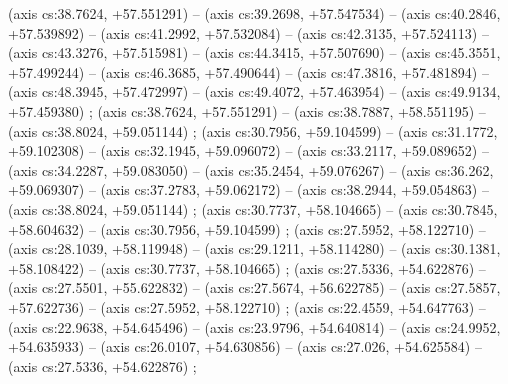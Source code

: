     (axis cs:38.7624,    +57.551291) --  (axis cs:39.2698,    +57.547534) --  (axis cs:40.2846,    +57.539892) --  (axis cs:41.2992,    +57.532084) --  (axis cs:42.3135,    +57.524113) --  (axis cs:43.3276,    +57.515981) --  (axis cs:44.3415,    +57.507690) --  (axis cs:45.3551,    +57.499244) --  (axis cs:46.3685,    +57.490644) --  (axis cs:47.3816,    +57.481894) --  (axis cs:48.3945,    +57.472997) --  (axis cs:49.4072,    +57.463954) --  (axis cs:49.9134,    +57.459380) ;
    (axis cs:38.7624,    +57.551291) --  (axis cs:38.7887,    +58.551195) --  (axis cs:38.8024,    +59.051144) ;
    (axis cs:30.7956,    +59.104599) --  (axis cs:31.1772,    +59.102308) --  (axis cs:32.1945,    +59.096072) --  (axis cs:33.2117,    +59.089652) --  (axis cs:34.2287,    +59.083050) --  (axis cs:35.2454,    +59.076267) --  (axis cs:36.262,    +59.069307) --  (axis cs:37.2783,    +59.062172) --  (axis cs:38.2944,    +59.054863) --  (axis cs:38.8024,    +59.051144) ;
    (axis cs:30.7737,    +58.104665) --  (axis cs:30.7845,    +58.604632) --  (axis cs:30.7956,    +59.104599) ;
    (axis cs:27.5952,    +58.122710) --  (axis cs:28.1039,    +58.119948) --  (axis cs:29.1211,    +58.114280) --  (axis cs:30.1381,    +58.108422) --  (axis cs:30.7737,    +58.104665) ;
    (axis cs:27.5336,    +54.622876) --  (axis cs:27.5501,    +55.622832) --  (axis cs:27.5674,    +56.622785) --  (axis cs:27.5857,    +57.622736) --  (axis cs:27.5952,    +58.122710) ;
    (axis cs:22.4559,    +54.647763) --  (axis cs:22.9638,    +54.645496) --  (axis cs:23.9796,    +54.640814) --  (axis cs:24.9952,    +54.635933) --  (axis cs:26.0107,    +54.630856) --  (axis cs:27.026,    +54.625584) --  (axis cs:27.5336,    +54.622876) ;
